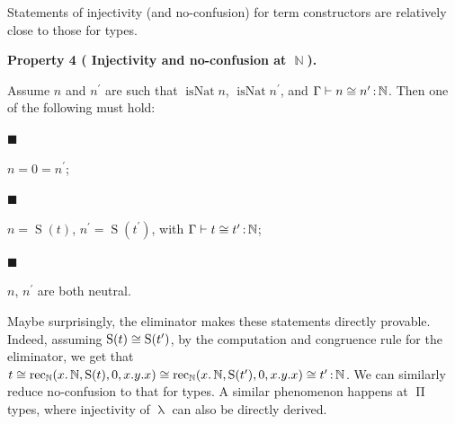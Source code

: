 Statements of injectivity (and no-confusion) for term constructors are relatively close to those for types.\par
 
 
 
\par\medskip\noindent\textbf{Property 4 (  Injectivity and no-confusion at $\operatorname{\mathbb{N}}$).}\par
 
 
Assume $n$ and $n^{\prime}$ are such that $\operatorname{isNat}n$, $\operatorname{isNat}n^{\prime}$, and $\Gamma\vdash n\mathrel{\raisebox{-0.5pt}{$\cong$}}n^{\prime}\operatorname{%
\mathrel{:}}\operatorname{\mathbb{N}}$. Then one of the following must hold:\par
  
\par\noindent  $\blacksquare$ 
 
$n=0=n^{\prime}$;\par
 
 
 
\par\noindent  $\blacksquare$ 
 
$n=\operatorname{S}(t)$, $n^{\prime}=\operatorname{S}(t^{\prime})$, with $\Gamma\vdash t\mathrel{\raisebox{-0.5pt}{$\cong$}}t^{\prime}\operatorname{%
\mathrel{:}}\operatorname{\mathbb{N}}$;\par
 
 
 
\par\noindent  $\blacksquare$ 
 
$n$, $n^{\prime}$ are both neutral.\par
 
 
  
 
 
 
Maybe surprisingly, the eliminator makes these statements directly provable. Indeed, assuming $\operatorname{S}(t)\mathrel{\raisebox{-0.5pt}{$\cong$}}\operatorname{S}(t^{%
\prime})$, by the computation and congruence rule for the eliminator, we get that $t\mathrel{\raisebox{-0.5pt}{$\cong$}}\operatorname{rec}_{\operatorname{\mathbb%
{N}}}(x.\operatorname{\mathbb{N}},\operatorname{S}(t),0,x.y.x)\mathrel{%
\raisebox{-0.5pt}{$\cong$}}\operatorname{rec}_{\operatorname{\mathbb{N}}}(x.%
\operatorname{\mathbb{N}},\operatorname{S}(t^{\prime}),0,x.y.x)\mathrel{%
\raisebox{-0.5pt}{$\cong$}}t^{\prime}\operatorname{\mathrel{:}}\operatorname{%
\mathbb{N}}$. We can similarly reduce no-confusion to that for types. A similar phenomenon happens at $\operatorname{\Pi}$ types, where injectivity of $\operatorname{\lambda}$ can also be directly derived.\par
 
